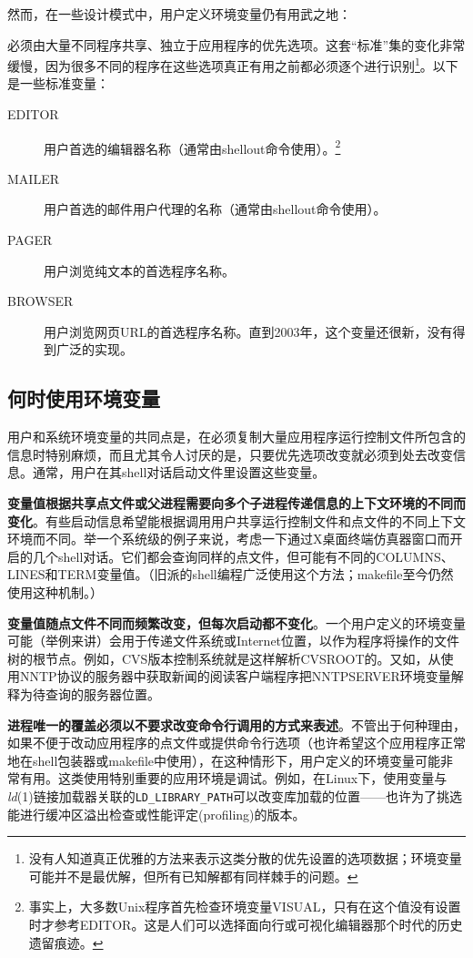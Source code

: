 \documentclass[12pt,oneside]{ctexbook}
\begin{document}
\begin{common-format}
然而，在一些设计模式中，用户定义环境变量仍有用武之地：

必须由大量不同程序共享、独立于应用程序的优先选项。这套“标准”集的变化非常缓慢，因为很多不同的程序在这些选项真正有用之前都必须逐个进行识别\footnote{没有人知道真正优雅的方法来表示这类分散的优先设置的选项数据；环境变量可能并不是最优解，但所有已知解都有同样棘手的问题。}。以下是一些标准变量：
\begin{description}
\item[EDITOR] 用户首选的编辑器名称（通常由shellout命令使用）。\footnote{事实上，大多数Unix程序首先检查环境变量VISUAL，只有在这个值没有设置时才参考EDITOR。这是人们可以选择面向行或可视化编辑器那个时代的历史遗留痕迹。}
\item[MAILER] 用户首选的邮件用户代理的名称（通常由shellout命令使用）。
\item[PAGER] 用户浏览纯文本的首选程序名称。
\item[BROWSER] 用户浏览网页URL的首选程序名称。直到2003年，这个变量还很新，没有得到广泛的实现。
\end{description}


\subsection{何时使用环境变量}
用户和系统环境变量的共同点是，在必须复制大量应用程序运行控制文件所包含的信息时特别麻烦，而且尤其令人讨厌的是，只要优先选项改变就必须到处去改变信息。通常，用户在其shell对话启动文件里设置这些变量。

\textbf{变量值根据共享点文件或父进程需要向多个子进程传递信息的上下文环境的不同而变化}。有些启动信息希望能根据调用用户共享运行控制文件和点文件的不同上下文环境而不同。举一个系统级的例子来说，考虑一下通过X桌面终端仿真器窗口而开启的几个shell对话。它们都会查询同样的点文件，但可能有不同的COLUMNS、LINES和TERM变量值。（旧派的shell编程广泛使用这个方法；makefile至今仍然使用这种机制。）

\textbf{变量值随点文件不同而频繁改变，但每次启动都不变化}。一个用户定义的环境变量可能（举例来讲）会用于传递文件系统或Internet位置，以作为程序将操作的文件树的根节点。例如，CVS版本控制系统就是这样解析CVSROOT的。又如，从使用NNTP协议的服务器中获取新闻的阅读客户端程序把NNTPSERVER环境变量解释为待查询的服务器位置。

\textbf{进程唯一的覆盖必须以不要求改变命令行调用的方式来表述}。不管出于何种理由，如果不便于改动应用程序的点文件或提供命令行选项（也许希望这个应用程序正常地在shell包装器或makefile中使用），在这种情形下，用户定义的环境变量可能非常有用。这类使用特别重要的应用环境是调试。例如，在Linux下，使用变量与\textit{ld}(1)链接加载器关联的\verb+LD_LIBRARY_PATH+可以改变库加载的位置——也许为了挑选能进行缓冲区溢出检查或性能评定(profiling)的版本。


\end{common-format}
\end{document}
